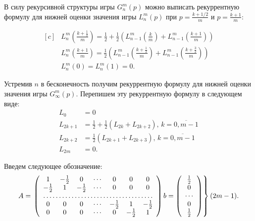 В силу рекурсивной структуры игры $ G_n^m(p) $ можно выписать рекуррентную формулу для нижней оценки значения игры $ L_n^m(p) $ при $ p = \frac{k+1/2}{m} $ и $ p = \frac{k+1}{m} $:

\begin{equation}
\label{eq:lower_bound:recurrence_finite}
\begin{aligned}[c]
&L_n^m\left(\frac{k+\frac{1}{2}}{m}\right) = 
    \frac{1}{2} + \frac{1}{2}\left(
        L_{n-1}^m\left(\frac{k}{m}\right) + 
        L_{n-1}^m\left(\frac{k + 1}{m}\right)
    \right) \\
&L_n^m\left(\frac{k+1}{m}\right) = 
    \frac{1}{2}\left(
        L_{n-1}^m\left(\frac{k+\frac{1}{2}}{m}\right) + 
        L_{n-1}^m\left(\frac{k+\frac{3}{2}}{m}\right)
    \right) \\
&L_n^m(0) = L_n^m(1) = 0.
\end{aligned}
\end{equation}

Устремив $ n $ в бесконечность получим рекуррентную формулу для нижней оценки значения игры $ G_\infty^m(p) $. Перепишем эту рекуррентную формулу в следующем виде:
\begin{equation}
\label{eq:lower_bound:recurrence_infinite}
\begin{aligned}
L_0 &= 0 \\
L_{2k + 1} &= \frac{1}{2} + \frac{1}{2} (L_{2k} + L_{2k + 2}), \, 
    k = \overline{0,m-1}\\
L_{2k + 2} &= \frac{1}{2} (L_{2k + 1} + L_{2k + 3}), \, 
    k = \overline{0,m-1}\\
L_{2m} &= 0.
\end{aligned}
\end{equation}

Введем следующее обозначение:
\begin{equation}
A = \left.
\left(\begin{array}{ccccccc}
    1 & -\frac{1}{2} & 0 & \cdots & 0 & 0 & 0 \\
    -\frac{1}{2} & 1 & -\frac{1}{2} & \cdots & 0 & 0 & 0 \\
    \hdotsfor{7} \\
    0 & 0 & 0 & \cdots & -\frac{1}{2} & 1 & -\frac{1}{2} \\
    0 & 0 & 0 & \cdots & 0 & -\frac{1}{2} & 1 \\
\end{array}\right)
b = \left(\begin{array}{c}
\frac{1}{2} \\
0\\
\cdots\\
0 \\
\frac{1}{2}
\end{array}\right)
\right\} (2m - 1).
\end{equation}


